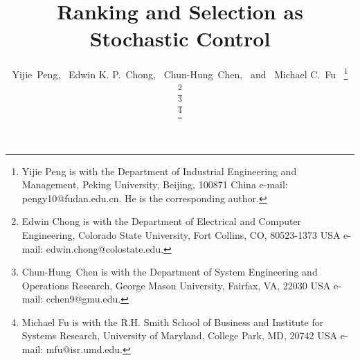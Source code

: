 \documentclass[journal]{IEEEtran}
\begin{document}
%
\title{ Ranking and Selection as Stochastic Control}
%
%
%

\author{ Yijie~Peng,~\IEEEmembership{}
        Edwin K. P.~Chong,~\IEEEmembership{} Chun-Hung~Chen,~\IEEEmembership{} and~ Michael C.~Fu~\IEEEmembership{}
\thanks{Yijie Peng is with the Department
of Industrial Engineering and Management, Peking University, 
Beijing, 100871 China e-mail:  pengy10@fudan.edu.cn. He is the corresponding author. }   

\thanks{Edwin Chong is with the Department
of Electrical and Computer Engineering, Colorado State University, Fort Collins,
CO, 80523-1373
 USA e-mail: edwin.chong@colostate.edu.}    
       
\thanks{Chun-Hung~Chen is with the Department
of System Engineering and Operations Research, George Mason University, Fairfax,
VA, 22030 USA e-mail: cchen9@gmu.edu.}%

\thanks{Michael Fu is with the R.H. Smith School of Business and Institute for Systems Research, University of Maryland, College Park,
MD, 20742 USA e-mail: mfu@isr.umd.edu.}


}

% 
%
\end{document}
